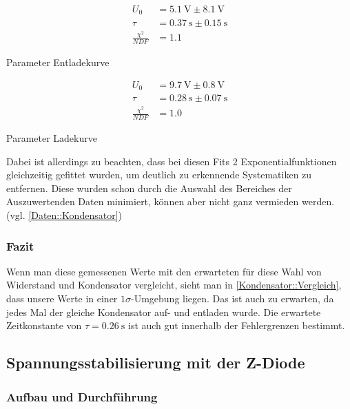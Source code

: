 \documentclass[12pt,twoside,a4paper]{scrartcl}
\begin{document}
				\begin{table}[H]
					\centering
					\label{Kondensator::Vergleich}
					\begin{minipage}{0.4 \textwidth}
						\begin{align*}
							U_0 &= \SI{5.1}{\volt} \pm \SI{8.1}{\volt} \\
							\tau &= \SI{0.37}{\second} \pm \SI{0.15}{\second} \\
							\frac{\chi^2}{NDF} &= 1.1
						\end{align*}
						\caption{Parameter Entladekurve}
					\end{minipage}
					\begin{minipage}{0.4 \textwidth}
						 \begin{align*}
							 	U_0 &= \SI{9.7}{\volt} \pm \SI{0.8}{\volt}\\
							 	\tau &= \SI{0.28}{\second} \pm \SI{0.07}{\second}\\
								\frac{\chi^2}{NDF} &= 1.0
						 \end{align*}
						\caption{Parameter Ladekurve}
					\end{minipage}
				\end{table}

			Dabei ist allerdings zu beachten, dass bei diesen Fits 2 Exponentialfunktionen gleichzeitig gefittet wurden, um deutlich zu erkennende Systematiken zu entfernen. Diese wurden schon durch die Auswahl des Bereiches der Auszuwertenden Daten minimiert, können aber nicht ganz vermieden werden. (vgl. \ref{Daten::Kondensator})

			\subsubsection{Fazit}
				Wenn man diese gemessenen Werte mit den erwarteten für diese Wahl von Widerstand und Kondensator vergleicht, sieht man in \ref{Kondensator::Vergleich}, dass unsere Werte in einer $1 \sigma$-Umgebung liegen. Das ist auch zu erwarten, da jedes Mal der gleiche Kondensator auf- und entladen wurde.
				Die erwartete Zeitkonstante von $\tau = \SI{0.26}{\second}$ ist auch gut innerhalb der Fehlergrenzen bestimmt.

	\subsection{Spannungsstabilisierung mit der Z-Diode}

		\subsubsection{Aufbau und Durchführung}
\end{document}
